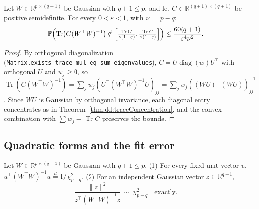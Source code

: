 \begin{theorem}\label{thm:dd:weightedTraceConcentration}
  \leanok
Let $W\in\mathbb R^{p\times(q+1)}$ be Gaussian with $q+1\le p$, and let $C\in\mathbb R^{(q+1)\times(q+1)}$ be positive semidefinite. For every $0<\varepsilon<1$, with $\nu:=p-q$:
\[
  \mathbb P\Bigl(\operatorname{Tr}\bigl(C(W^\top W)^{-1}\bigr)\notin\Bigl[\tfrac{\operatorname{Tr} C}{\nu(1+\varepsilon)},\tfrac{\operatorname{Tr} C}{\nu(1-\varepsilon)}\Bigr]\Bigr)\le\frac{60(q+1)}{\varepsilon^4\nu^2}.
\]
\end{theorem}

\begin{proof}
  \leanok
By orthogonal diagonalization (\texttt{Matrix.exists\_trace\_mul\_eq\_sum\_eigenvalues}), $C=U\operatorname{diag}(w)U^\top$ with orthogonal $U$ and $w_j\ge0$, so $\operatorname{Tr}(C(W^\top W)^{-1})=\sum_j w_j(U^\top(W^\top W)^{-1}U)_{jj}=\sum_j w_j((WU)^\top(WU))^{-1}_{jj}$. Since $WU$ is Gaussian by orthogonal invariance, each diagonal entry concentrates as in Theorem~\ref{thm:dd:traceConcentration}, and the convex combination with $\sum w_j=\operatorname{Tr} C$ preserves the bounds.
\end{proof}

\subsection{Quadratic forms and the fit error}

\begin{theorem}\label{thm:dd:quadFormLaw}
  \leanok
Let $W\in\mathbb R^{p\times(q+1)}$ be Gaussian with $q+1\le p$. (1) For every fixed unit vector $u$, $u^\top(W^\top W)^{-1}u\overset d=1/\chi^2_{p-q}$.
(2) For an independent Gaussian vector $z\in\mathbb R^{q+1}$,
\[
  \frac{\|z\|^2}{z^\top(W^\top W)^{-1}z}\ \sim\ \chi^2_{p-q}\quad\text{exactly.}
\]
\end{theorem}

